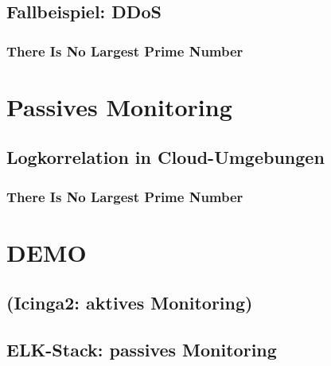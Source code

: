 \documentclass[10pt]{beamer} %
\begin{document}
\subsection{Fallbeispiel: DDoS}
\begin{frame}
\frametitle{There Is No Largest Prime Number}

\end{frame}

\section{Passives Monitoring}

\subsection{Logkorrelation in Cloud-Umgebungen}
\begin{frame}
\frametitle{There Is No Largest Prime Number}

\end{frame}
\section{DEMO}

\subsection{(Icinga2: aktives Monitoring)}

\subsection{ELK-Stack: passives Monitoring}
\end{document}
